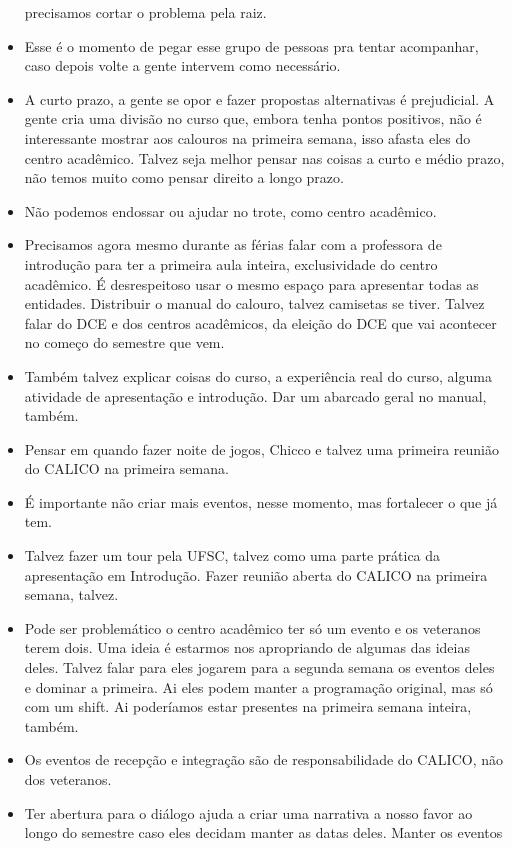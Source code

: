 \documentclass{ata-calico}
\begin{document}
\begin{itemize}
  precisamos cortar o problema pela raiz.
\item Esse é o momento de pegar esse grupo de pessoas pra tentar acompanhar, caso
  depois volte a gente intervem como necessário.
\item A curto prazo, a gente se opor e fazer propostas alternativas é prejudicial.
  A gente cria uma divisão no curso que, embora tenha pontos positivos, não é
  interessante mostrar aos calouros na primeira semana, isso afasta eles do
  centro acadêmico. Talvez seja melhor pensar nas coisas a curto e médio prazo,
  não temos muito como pensar direito a longo prazo.
\item Não podemos endossar ou ajudar no trote, como centro acadêmico.
\item Precisamos agora mesmo durante as férias falar com a professora de introdução
  para ter a primeira aula inteira, exclusividade do centro acadêmico. É
  desrespeitoso usar o mesmo espaço para apresentar todas as entidades.
  Distribuir o manual do calouro, talvez camisetas se tiver. Talvez falar do
  DCE e dos centros acadêmicos, da eleição do DCE que vai acontecer no começo
  do semestre que vem.
\item Também talvez explicar coisas do curso, a experiência real do curso, alguma
  atividade de apresentação e introdução. Dar um abarcado geral no manual,
  também.
\item Pensar em quando fazer noite de jogos, Chicco e talvez uma primeira reunião
  do CALICO na primeira semana.
\item É importante não criar mais eventos, nesse momento, mas fortalecer o que já tem.
\item Talvez fazer um tour pela UFSC, talvez como uma parte prática da apresentação
  em Introdução. Fazer reunião aberta do CALICO na primeira semana, talvez.
\item Pode ser problemático o centro acadêmico ter só um evento e os veteranos terem dois. Uma
  ideia é estarmos nos apropriando de algumas das ideias deles. Talvez falar
  para eles jogarem para a segunda semana os eventos deles e dominar a
  primeira. Ai eles podem manter a programação original, mas só com um shift.
  Ai poderíamos estar presentes na primeira semana inteira, também.
\item Os eventos de recepção e integração são de responsabilidade do CALICO, não
  dos veteranos.
\item Ter abertura para o diálogo ajuda a criar uma narrativa a nosso favor ao
  longo do semestre caso eles decidam manter as datas deles.  Manter os eventos

\end{itemize}
\end{document}
